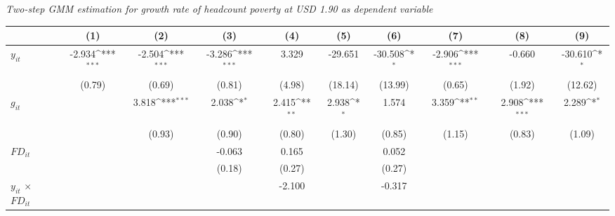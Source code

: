 \documentclass[12pt, a4paper]{article}
\begin{document}
\begin{table}[htbp]
\begin{threeparttable}
\begin{tablenotes}
		\end{tablenotes}
	\end{threeparttable}
	\caption[Two-Step System-GMM Estimation Results for Headcount Poverty at USD 1.90]{\textit{Two-step GMM estimation for growth rate of headcount poverty at USD 1.90 as dependent variable}}
	\label{2GMM190full}
\end{table}

	\begin{table}[htbp]
	\centering
	\scriptsize
	\setlength\tabcolsep{1pt}	
	\begin{threeparttable}
		{
			\def\sym#1{\ifmmode^{#1}\else\(^{#1}\)\fi}
			\begin{tabular}{l*{9}{c}}
				\hline\hline
				&\multicolumn{1}{c}{(1)}&\multicolumn{1}{c}{(2)}&\multicolumn{1}{c}{(3)}&\multicolumn{1}{c}{(4)}&\multicolumn{1}{c}{(5)}&\multicolumn{1}{c}{(6)}&\multicolumn{1}{c}{(7)}&\multicolumn{1}{c}{(8)}&\multicolumn{1}{c}{(9)}\\
				\hline
				$y_{it}$               &      -2.934\sym{***}&      -2.504\sym{***}&      -3.286\sym{***}&       3.329         &     -29.651         &     -30.508\sym{*}  &      -2.906\sym{***}&      -0.660         &     -30.610\sym{*}  \\
				&      (0.79)         &      (0.69)         &      (0.81)         &      (4.98)         &     (18.14)         &     (13.99)         &      (0.65)         &      (1.92)         &     (12.62)         \\
				$g_{it}$             &                     &       3.818\sym{***}&       2.038\sym{*}  &       2.415\sym{**} &       2.938\sym{*}  &       1.574         &       3.359\sym{**} &       2.908\sym{***}&       2.289\sym{*}  \\
				&                     &      (0.93)         &      (0.90)         &      (0.80)         &      (1.30)         &      (0.85)         &      (1.15)         &      (0.83)         &      (1.09)         \\
				$FD_{it}$                &                     &                     &      -0.063         &       0.165         &                     &       0.052         &                     &                     &                     \\
				&                     &                     &      (0.18)         &      (0.27)         &                     &      (0.27)         &                     &                     &                     \\
				$y_{it}$ $\times$ $FD_{it}$ &                     &                     &                     &      -2.100         &                     &      -0.317         &                     &                     &                     \\

\end{tabular}}
\end{threeparttable}
\end{table}
\end{document}

